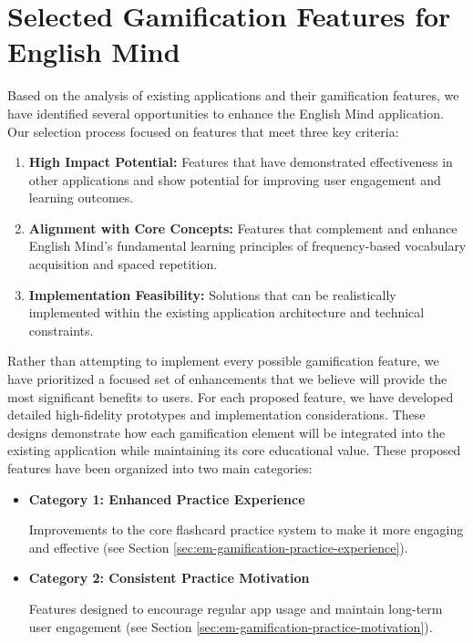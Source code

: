 \chapter{Selected Gamification Features for English Mind}

Based on the analysis of existing applications and their gamification features, we have identified several opportunities to enhance the English Mind application. Our selection process focused on features that meet three key criteria:

\begin{enumerate}
    \item \textbf{High Impact Potential:} Features that have demonstrated effectiveness in other applications and show potential for improving user engagement and learning outcomes.
    
    \item \textbf{Alignment with Core Concepts:} Features that complement and enhance English Mind's fundamental learning principles of frequency-based vocabulary acquisition and spaced repetition.
    
    \item \textbf{Implementation Feasibility:} Solutions that can be realistically implemented within the existing application architecture and technical constraints.
\end{enumerate}

Rather than attempting to implement every possible gamification feature, we have prioritized a focused set of enhancements that we believe will provide the most significant benefits to users. For each proposed feature, we have developed detailed high-fidelity prototypes and implementation considerations. These designs demonstrate how each gamification element will be integrated into the existing application while maintaining its core educational value. These proposed features have been organized into two main categories:

\begin{itemize}
    \item \textbf{Category 1: Enhanced Practice Experience}
    
    Improvements to the core flashcard practice system to make it more engaging and effective (see Section \ref{sec:em-gamification-practice-experience}).
    
    \item \textbf{Category 2: Consistent Practice Motivation}
    
    Features designed to encourage regular app usage and maintain long-term user engagement (see Section \ref{sec:em-gamification-practice-motivation}).
\end{itemize}

